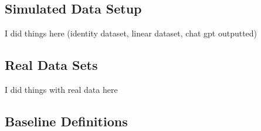

\subsection{Simulated Data Setup}

I did things here (identity dataset, linear dataset, chat gpt outputted)


\subsection{Real Data Sets}

I did things with real data here


\subsection{Baseline Definitions}



